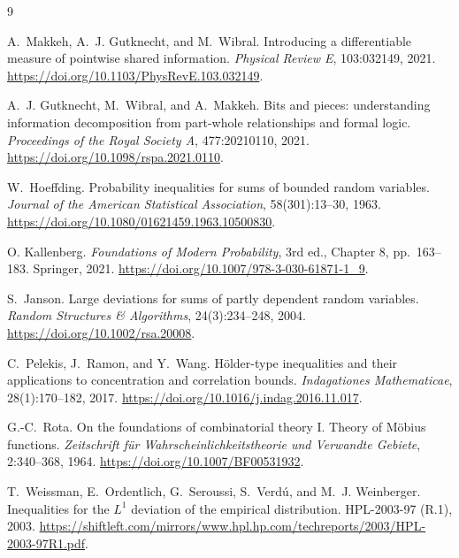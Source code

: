 \documentclass[11pt]{article}
\theoremstyle{definition}
\begin{document}
\begingroup
\small
\begin{thebibliography}{9}

A.~Makkeh, A.~J. Gutknecht, and M.~Wibral.
\newblock Introducing a differentiable measure of pointwise shared information.
\newblock \emph{Physical Review E}, 103:032149, 2021.
\newblock \url{https://doi.org/10.1103/PhysRevE.103.032149}.

A.~J. Gutknecht, M.~Wibral, and A.~Makkeh.
\newblock Bits and pieces: understanding information decomposition from part-whole relationships
and formal logic.
\newblock \emph{Proceedings of the Royal Society A}, 477:20210110, 2021.
\newblock \url{https://doi.org/10.1098/rspa.2021.0110}.

W.~Hoeffding.
\newblock Probability inequalities for sums of bounded random variables.
\newblock \emph{Journal of the American Statistical Association}, 58(301):13--30, 1963.
\newblock \url{https://doi.org/10.1080/01621459.1963.10500830}.

O. Kallenberg.
\emph{Foundations of Modern Probability}, 3rd ed., Chapter 8, pp.~163--183.
Springer, 2021. \url{https://doi.org/10.1007/978-3-030-61871-1_9}.

S.~Janson.
\newblock Large deviations for sums of partly dependent random variables.
\newblock \emph{Random Structures \& Algorithms}, 24(3):234--248, 2004.
\newblock \url{https://doi.org/10.1002/rsa.20008}.

C.~Pelekis, J.~Ramon, and Y.~Wang.
\newblock H{\"o}lder-type inequalities and their applications to concentration and correlation
bounds.
\newblock \emph{Indagationes Mathematicae}, 28(1):170--182, 2017.
\newblock \url{https://doi.org/10.1016/j.indag.2016.11.017}.

G.-C.~Rota.
\newblock On the foundations of combinatorial theory I. Theory of M{\"o}bius functions.
\newblock \emph{Zeitschrift f{\"u}r Wahrscheinlichkeitstheorie und Verwandte Gebiete},
2:340--368, 1964.
\newblock \url{https://doi.org/10.1007/BF00531932}.

T.~Weissman, E.~Ordentlich, G.~Seroussi, S.~Verd{\'u}, and M.~J. Weinberger.
\newblock Inequalities for the $L^1$ deviation of the empirical distribution.
\newblock HPL-2003-97 (R.1), 2003.
\newblock \url{https://shiftleft.com/mirrors/www.hpl.hp.com/techreports/2003/HPL-2003-97R1.pdf}.

\end{thebibliography}
\endgroup
\end{document}
